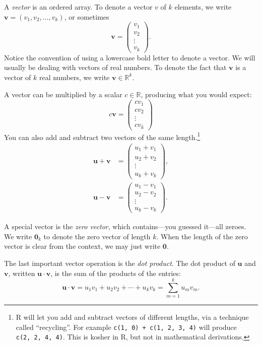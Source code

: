 \documentclass[12pt,oneside,openany]{book}
\begin{document}
A \emph{vector} is an ordered array. To denote a vector \(v\) of \(k\)
elements, we write \(\mathbf{v} = (v_1, v_2, \ldots, v_k)\), or
sometimes \[
\mathbf{v} = \begin{pmatrix} v_1 \\ v_2 \\ \vdots \\ v_k \end{pmatrix}.
\] Notice the convention of using a lowercase bold letter to denote a
vector. We will usually be dealing with vectors of real numbers. To
denote the fact that \(\mathbf{v}\) is a vector of \(k\) real numbers,
we write \(\mathbf{v} \in \mathbb{R}^k\).

A vector can be multiplied by a scalar \(c \in \mathbb{R}\), producing
what you would expect: \[
c \mathbf{v} = \begin{pmatrix} c v_1 \\ c v_2 \\ \vdots \\ c v_k \end{pmatrix}
\] You can also add and subtract two vectors of the same
length.\footnote{R will let you add and subtract vectors of different
  lengths, via a technique called ``recycling''. For example
  \texttt{c(1,\ 0)\ +\ c(1,\ 2,\ 3,\ 4)} will produce
  \texttt{c(2,\ 2,\ 4,\ 4)}. This is kosher in R, but not in
  mathematical derivations.} \[
\begin{aligned}
\mathbf{u} + \mathbf{v} &= \begin{pmatrix}
  u_1 + v_1 \\ u_2 + v_2 \\ \vdots \\ u_k + v_k
\end{pmatrix}, \\
\mathbf{u} - \mathbf{v} &= \begin{pmatrix}
  u_1 - v_1 \\ u_2 - v_2 \\ \vdots \\ u_k - v_k
\end{pmatrix}.
\end{aligned}
\]

A special vector is the \emph{zero vector}, which contains---you guessed
it---all zeroes. We write \(\mathbf{0}_k\) to denote the zero vector of
length \(k\). When the length of the zero vector is clear from the
context, we may just write \(\mathbf{0}\).

The last important vector operation is the \emph{dot product}. The dot
product of \(\mathbf{u}\) and \(\mathbf{v}\), written
\(\mathbf{u} \cdot \mathbf{v}\), is the sum of the products of the
entries: \[
\mathbf{u} \cdot \mathbf{v}
=
u_1 v_1 + u_2 v_2 + \cdots + u_k v_k
=
\sum_{m=1}^k u_m v_m.
\]
\end{document}
